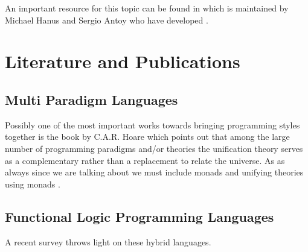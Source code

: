\documentclass[thesis-solanki.tex]{subfiles}
\begin{document}
\begin{comment}

The important piece however is the fact that there is a dedicated website \cite{website:funclogprog} for the history,
research and development, existing languages, the literature, the contacts and everything else that one can think
of for functional logic languages.
\end{comment}
An important resource for this topic can be found in \cite{website:funclogprog} which is maintained by Michael Hanus \cite{website:mhanus} 
and Sergio Antoy \cite{website:santoy} who have developed  \cite{hanus1995curry}.

\begin{comment}
As a matter of fact the holy grail of information is maintained by two of the most important people in the field
Michael Hanus \cite{website:mhanus} and Sergio Antoy \cite{website:santoy}.
\end{comment}




\section{Literature and Publications}
\subsection{Multi Paradigm Languages}
Possibly one of the most important works towards bringing programming styles together is the book by C.A.R.
Hoare \cite{hoare1998unifying} which points out that among the large number of programming paradigms and/or
theories the unification theory serves as a complementary rather than a replacement to relate the universe.
As as always since we are talking about  we must include monads and unifying theories using
monads \cite{gibbons2013unifying}.
 

\subsection{Functional Logic Programming Languages}

A recent survey \cite{hanus2007multi} throws light on these hybrid languages. 
\end{document}

